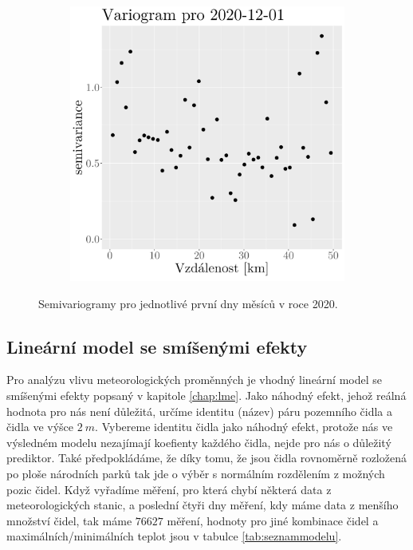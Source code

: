\begin{figure}
\begin{subfigure}{0.30\textwidth}
		\caption{}
		\label{fig:variogram11}
	\end{subfigure}
\hfill
	\begin{subfigure}{0.30\textwidth}
		\includegraphics[width=\textwidth]{img/ch2/variograms/variogram_max15cm12.png}
		\caption{}
		\label{fig:variogram12}
	\end{subfigure}
	\caption{Semivariogramy pro jednotlivé první dny měsíců v roce 2020.}
	\label{fig:variograms}
\end{figure}

\subsection{Lineární model se smíšenými efekty}
Pro analýzu vlivu meteorologických proměnných je vhodný lineární model se smíšenými efekty popsaný v kapitole \ref{chap:lme}. Jako náhodný efekt, jehož reálná hodnota pro nás není důležitá, určíme identitu (název) páru pozemního čidla a čidla ve výšce $\SI{2}{m}$. Vybereme identitu čidla jako náhodný efekt, protože nás ve výsledném modelu nezajímají koefienty každého čidla, nejde pro nás o důležitý prediktor. Také předpokládáme, že díky tomu, že jsou čidla rovnoměrně rozložená po ploše národních parků tak jde o výběr s normálním rozdělením z možných pozic čidel. Když vyřadíme měření, pro která chybí některá data z meteorologických stanic, a poslední čtyři dny měření, kdy máme data z menšího množství čidel, tak máme $76627$ měření, hodnoty pro jiné kombinace čidel a maximálních/minimálních teplot jsou v tabulce \ref{tab:seznammodelu}.

